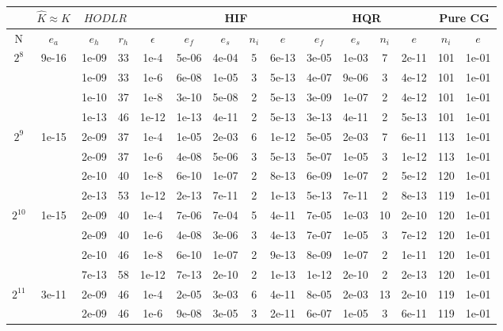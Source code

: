 \documentclass[11pt]{article}
\begin{document}
\begin{table}[!htbp]
\centering
\begin{tabular}{|c|c|c|c|c|c|c|c|c|c|c|c|c|c|c|}
\hline
\multicolumn{1}{c|}{} & \multicolumn{1}{c|}{$\hat{K} \approx K$} & \multicolumn{2}{c|}{$HODLR$} & \multicolumn{1}{c|}{} &\multicolumn{4}{c|}{HIF} & \multicolumn{4}{c|}{HQR} & \multicolumn{2}{c|}{Pure CG} \\
\hline
N & $e_{a}$ & $e_{h}$ & $r_{h}$ & $\epsilon$ & $e_{f}$ & $e_{s}$ & $n_{i}$ & $e$ & $e_{f}$  & $e_{s}$ & $n_{i}$ & $e$ &  $n_{i}$ & $e$ \\ 
\hline
$2^{8}$ & 9e-16 & 1e-09 & 33 & 1e-4 & 5e-06 & 4e-04 & 5 & 6e-13 & 3e-05 & 1e-03 & 7 & 2e-11 & 101 & 1e-01\\
~ & ~ & 1e-09 & 33 & 1e-6 & 6e-08 & 1e-05 & 3 & 5e-13 & 4e-07 & 9e-06 & 3 & 4e-12 & 101 & 1e-01\\
~ & ~ & 1e-10 & 37 & 1e-8 & 3e-10 & 5e-08 & 2 & 5e-13 & 3e-09 & 1e-07 & 2 & 4e-12 & 101 & 1e-01\\
~ & ~ & 1e-13 & 46 & 1e-12 & 1e-13 & 4e-11 & 2 & 5e-13 & 3e-13 & 4e-11 & 2 & 5e-13 & 101 & 1e-01\\
\hline
$2^{9}$ & 1e-15 & 2e-09 & 37 & 1e-4 & 1e-05 & 2e-03 & 6 & 1e-12 & 5e-05 & 2e-03 & 7 & 6e-11 & 113 & 1e-01\\
~ & ~ & 2e-09 & 37 & 1e-6 & 4e-08 & 5e-06 & 3 & 5e-13 & 5e-07 & 1e-05 & 3 & 1e-12 & 113 & 1e-01\\
~ & ~ & 2e-10 & 40 & 1e-8 & 6e-10 & 1e-07 & 2 & 8e-13 & 6e-09 & 1e-07 & 2 & 5e-12 & 120 & 1e-01\\
~ & ~ & 2e-13 & 53 & 1e-12 & 2e-13 & 7e-11 & 2 & 1e-13 & 5e-13 & 7e-11 & 2 & 8e-13 & 119 & 1e-01\\
\hline
$2^{10}$ & 1e-15 & 2e-09 & 40 & 1e-4 & 7e-06 & 7e-04 & 5 & 4e-11 & 7e-05 & 1e-03 & 10 & 2e-10 & 120 & 1e-01\\
~ & ~ & 2e-09 & 40 & 1e-6 & 4e-08 & 3e-06 & 3 & 4e-13 & 7e-07 & 1e-05 & 3 & 7e-12 & 120 & 1e-01\\
~ & ~ & 2e-10 & 46 & 1e-8 & 6e-10 & 1e-07 & 2 & 9e-13 & 8e-09 & 1e-07 & 2 & 1e-11 & 120 & 1e-01\\
~ & ~ & 7e-13 & 58 & 1e-12 & 7e-13 & 2e-10 & 2 & 1e-13 & 1e-12 & 2e-10 & 2 & 2e-13 & 120 & 1e-01\\
\hline
$2^{11}$ & 3e-11 & 2e-09 & 46 & 1e-4 & 2e-05 & 3e-03 & 6 & 4e-11 & 8e-05 & 2e-03 & 13 & 2e-10 & 119 & 1e-01\\
~ & ~ & 2e-09 & 46 & 1e-6 & 9e-08 & 3e-05 & 3 & 2e-11 & 6e-07 & 1e-05 & 3 & 6e-11 & 119 & 1e-01\\

\end{tabular}
\end{table}
\end{document}
